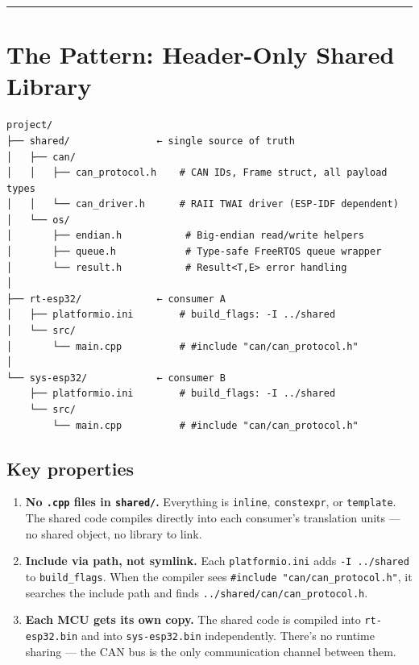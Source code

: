 \documentclass[12pt,a4paper,oneside]{report}
\begin{document}
\begin{center}\rule{0.5\linewidth}{0.5pt}\end{center}

\section{The Pattern: Header-Only Shared
Library}\label{the-pattern-header-only-shared-library}

\begin{verbatim}
project/
├── shared/               ← single source of truth
│   ├── can/
│   │   ├── can_protocol.h    # CAN IDs, Frame struct, all payload types
│   │   └── can_driver.h      # RAII TWAI driver (ESP-IDF dependent)
│   └── os/
│       ├── endian.h           # Big-endian read/write helpers
│       ├── queue.h            # Type-safe FreeRTOS queue wrapper
│       └── result.h           # Result<T,E> error handling
│
├── rt-esp32/             ← consumer A
│   ├── platformio.ini        # build_flags: -I ../shared
│   └── src/
│       └── main.cpp          # #include "can/can_protocol.h"
│
└── sys-esp32/            ← consumer B
    ├── platformio.ini        # build_flags: -I ../shared
    └── src/
        └── main.cpp          # #include "can/can_protocol.h"
\end{verbatim}

\subsection{Key properties}\label{key-properties}

\begin{enumerate}
\def\labelenumi{\arabic{enumi}.}
\item
  \textbf{No \texttt{.cpp} files in \texttt{shared/}.} Everything is
  \texttt{inline}, \texttt{constexpr}, or \texttt{template}. The shared code
  compiles directly into each consumer's translation units --- no shared object,
  no library to link.
\item
  \textbf{Include via path, not symlink.} Each \texttt{platformio.ini} adds
  \texttt{-I\ ../shared} to \texttt{build\_flags}. When the compiler sees
  \texttt{\#include\ "can/can\_protocol.h"}, it searches the include path and
  finds \texttt{../shared/can/can\_protocol.h}.
\item
  \textbf{Each MCU gets its own copy.} The shared code is compiled into
  \texttt{rt-esp32.bin} and into \texttt{sys-esp32.bin} independently. There's
  no runtime sharing --- the CAN bus is the only communication channel between
  them.
\end{enumerate}
\end{document}
